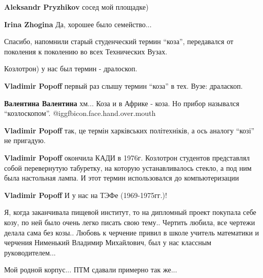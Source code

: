 \begin{itemize}
\begin{itemize} %
\textbf{Aleksandr Pryzhikov} сосед мой площадке)

\textbf{Irina Zhogina} Да, хорошее было семейство...
\end{itemize} %


Спасибо, напомнили старый студенческий термин \enquote{коза}, передавался от
поколения к поколению во всех Технических Вузах.

Козлотрон) у нас был термин - дралоскоп.

\begin{itemize} %
\textbf{Vladimir Popoff} первый раз слышу термин \enquote{коза} в тех. Вузе: драласкоп.

\textbf{Валентина Валентина} хм... Коза и в Африке - коза. Но прибор назывался \enquote{козлоскопом}. @igg{fbicon.face.hand.over.mouth} 

\textbf{Vladimir Popoff} так, це термін харківських політехніків, а ось аналогу \enquote{козі} не пригадую.

\textbf{Vladimir Popoff} окончила КАДИ в 1976г. Козлотрон студентов представлял собой перевернутую табуретку, на которую устанавливалось стекло, а под ним была настольная лампа. И этот термин использовался до компьютеризации

\textbf{Vladimir Popoff} И у нас на ТЭФе (1969-1975гг.)!
\end{itemize} %


Я, когда заканчивала пищевой институт, то на дипломный проект покупала себе
козу, по ней было очень легко писать свою тему.. Чертить любила, все чертежи
делала сама без козы.. Любовь к черчение привил в школе учитель математики и
черчения Нименький Владимир Михайлович, был у нас классным руководителем...

Мой родной корпус... ПТМ сдавали примерно так же...

\end{itemize} %

